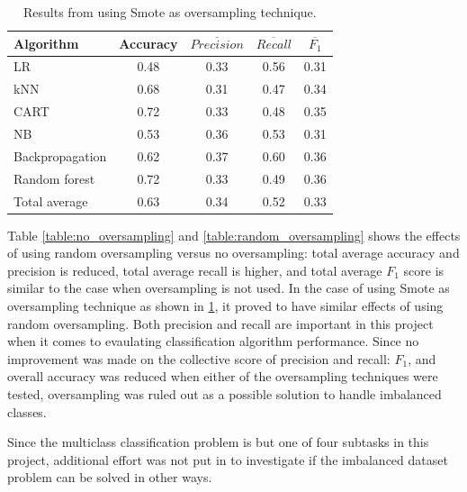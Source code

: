 	\begin{table}[H]
	\centering
	\caption{Results from using Smote as oversampling technique.}
		\begin{tabular}[5]{l | c | c | c | c}
    			Algorithm & Accuracy & $\overline{Precision}$ & $\overline{Recall}$ & $\overline{F_1}$ \\
    			\hline
			LR & 0.48 & 0.33 & 0.56 & 0.31 \\
			kNN & 0.68 &  0.31 & 0.47 &  0.34 \\
			CART & 0.72 & 0.33 & 0.48 &  0.35 \\
			NB &  0.53 & 0.36 & 0.53 & 0.31 \\
			Backpropagation & 0.62 & 0.37 & 0.60 & 0.36 \\
			Random forest & 0.72 & 0.33 & 0.49 &  0.36 \\
			\hline
			Total average & 0.63 & 0.34 & 0.52 & 0.33 
			\label{table:smote_oversampling}
		\end{tabular}
	\end{table}
	
	Table \ref{table:no_oversampling} and \ref{table:random_oversampling} shows the effects of using random oversampling versus no oversampling: total average accuracy and precision is reduced, total average recall is higher, and total average $F_1$ score is similar to the case when oversampling is not used. In the case of using Smote as oversampling technique as shown in \ref{table:smote_oversampling}, it proved to have similar effects of using random oversampling. Both precision and recall are important in this project when it comes to evaulating classification algorithm performance. Since no improvement was made on the collective score of precision and recall: $F_1$, and overall accuracy was reduced when either of the oversampling techniques were tested, oversampling was ruled out as a possible solution to handle imbalanced classes. 

	Since the multiclass classification problem is but one of four subtasks in this project, additional effort was not put in to investigate if the imbalanced dataset problem can be solved in other ways.